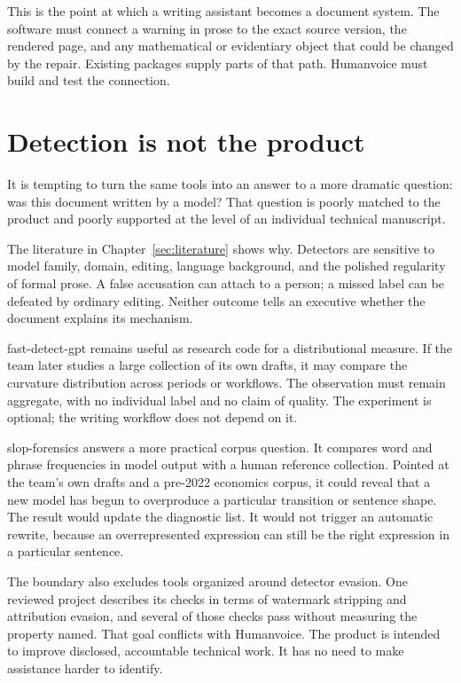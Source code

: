 This is the point at which a writing assistant becomes a document system. The
software must connect a warning in prose to the exact source version, the
rendered page, and any mathematical or evidentiary object that could be changed
by the repair. Existing packages supply parts of that path. Humanvoice must
build and test the connection.

\section{Detection is not the product}
\label{sec:oss-detection-boundary}

It is tempting to turn the same tools into an answer to a more dramatic
question: was this document written by a model? That question is poorly matched
to the product and poorly supported at the level of an individual technical
manuscript.

The literature in Chapter~\ref{sec:literature} shows why. Detectors are
sensitive to model family, domain, editing, language background, and the
polished regularity of formal prose. A false accusation can attach to a person;
a missed label can be defeated by ordinary editing. Neither outcome tells an
executive whether the document explains its mechanism.

fast-detect-gpt remains useful as research code for a distributional measure.
If the team later studies a large collection of its own drafts, it may compare
the curvature distribution across periods or workflows. The observation must
remain aggregate, with no individual label and no claim of quality. The
experiment is optional; the writing workflow does not depend on it.

slop-forensics answers a more practical corpus question. It compares word and
phrase frequencies in model output with a human reference collection. Pointed
at the team's own drafts and a pre-2022 economics corpus, it could reveal that
a new model has begun to overproduce a particular transition or sentence
shape. The result would update the diagnostic list. It would not trigger an
automatic rewrite, because an overrepresented expression can still be the
right expression in a particular sentence.

The boundary also excludes tools organized around detector evasion. One
reviewed project describes its checks in terms of watermark stripping and
attribution evasion, and several of those checks pass without measuring the
property named. That goal conflicts with Humanvoice. The product is intended
to improve disclosed, accountable technical work. It has no need to make
assistance harder to identify.

